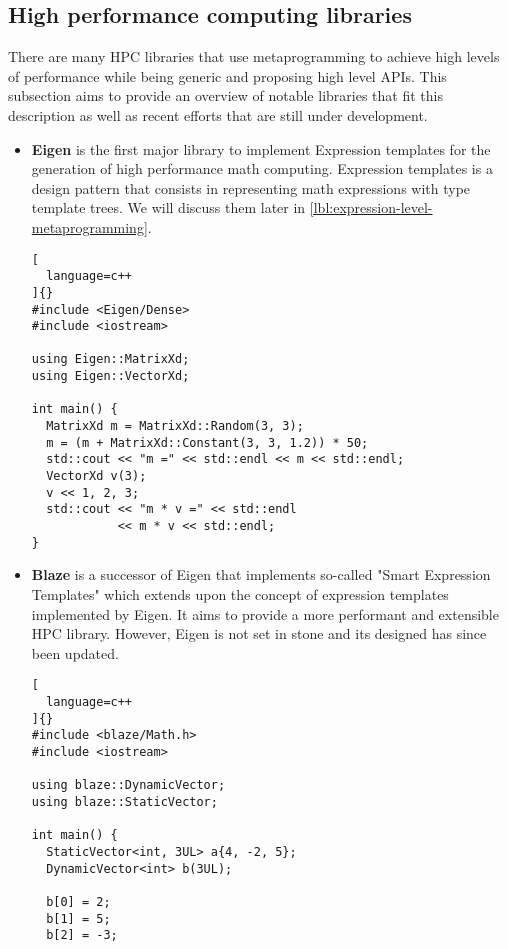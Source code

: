 \documentclass[../main]{subfiles}
\begin{document}
\subsection{High performance computing libraries}

There are many \cpp HPC libraries that use metaprogramming to achieve
high levels of performance while being generic and proposing high level APIs.
This subsection aims to provide an overview of notable libraries that fit this
description as well as recent efforts that are still under development.

\begin{itemize}

\item
\textbf{Eigen} \cite{eigen} is the first major \cpp library to implement
Expression templates for the generation of high performance math computing.
Expression templates is a \cpp design pattern that consists in representing
math expressions with type template trees. We will discuss them later
in \ref{lbl:expression-level-metaprogramming}.

\begin{lstlisting}[
  language=c++
]{}
#include <Eigen/Dense>
#include <iostream>

using Eigen::MatrixXd;
using Eigen::VectorXd;

int main() {
  MatrixXd m = MatrixXd::Random(3, 3);
  m = (m + MatrixXd::Constant(3, 3, 1.2)) * 50;
  std::cout << "m =" << std::endl << m << std::endl;
  VectorXd v(3);
  v << 1, 2, 3;
  std::cout << "m * v =" << std::endl
            << m * v << std::endl;
}
\end{lstlisting}

\item
\textbf{Blaze} \cite{blazelib} is a successor of Eigen that implements so-called
"Smart Expression Templates" which extends upon the concept of
expression templates implemented by Eigen. It aims to provide a more performant
and extensible HPC library. However, Eigen is not set in stone
and its designed has since been updated.

\begin{lstlisting}[
  language=c++
]{}
#include <blaze/Math.h>
#include <iostream>

using blaze::DynamicVector;
using blaze::StaticVector;

int main() {
  StaticVector<int, 3UL> a{4, -2, 5};
  DynamicVector<int> b(3UL);

  b[0] = 2;
  b[1] = 5;
  b[2] = -3;


\end{lstlisting}
\end{itemize}
\end{document}
